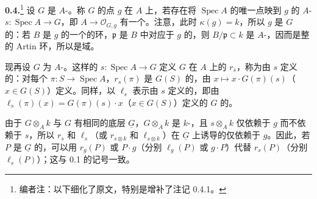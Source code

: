 \textbf{0.4.}\footnote{编者注：以下细化了原文，特别是增补了注记 0.4.1。} 设 $G$ 是 $A$-。称 $G$ 的点 $g$ 在 $A$ 上，若存在将 $\operatorname{Spec}A$ 的唯一点映到 $g$ 的 $A$- $s:\operatorname{Spec}A\to G$，即 $A\to\mathcal O_{G,g}$ 有一个。注意，此时 $\kappa(g)=k$，所以 $g$ 是 $G$ 的：若 $B$ 是 $g$ 的一个的环，$\mathfrak p$ 是 $B$ 中对应于 $g$ 的，则 $B/\mathfrak p\subset k$ 是 $A$-，因而是整的 Artin 环，所以是域。

现再设 $G$ 为 $A$-。这样的 $s:\operatorname{Spec}A\to G$ 定义 $G$ 在 $A$ 上的 $r_s$，称为由 $s$ 定义的：对每个 $\pi:S\to\operatorname{Spec}A$，$r_s(\pi)$ 是 $G(S)$ 的，由 $x\mapsto x\cdot G(\pi)(s)$（$x\in G(S)$）定义。同样，以 $\ell_s$ 表示由 $s$ 定义的，即由 $\ell_s(\pi)(x)=G(\pi)(s)\cdot x$（$x\in G(S)$）定义的 $G$ 的。

由于 $G\otimes_A k$ 与 $G$ 有相同的底层 $\underline G$，$G\otimes_A k$ 是 $k$-，且 $s\otimes_A k$ 仅依赖于 $g$ 而不依赖于 $s$，所以 $r_s$ 和 $\ell_s$（或 $r_{s\otimes k}$ 和 $\ell_{s\otimes k}$）在 $\underline G$ 上诱导的仅依赖于 $g$。因此，若 $P$ 是 $\underline G$ 的，可以用 $r_g(P)$ 或 $P\cdot g$（分别 $\ell_g(P)$ 或 $g\cdot P$）代替 $r_s(P)$（分别 $\ell_s(P)$）；这与 0.1 的记号一致。

